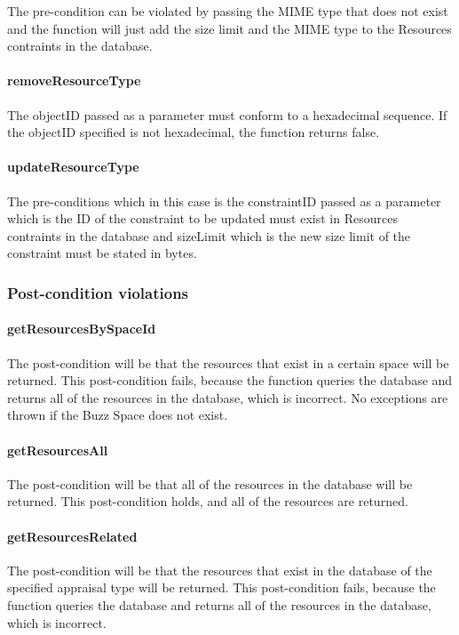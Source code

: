 \documentclass[a4paper]{article}
\begin{document}
The pre-condition can be violated by passing the MIME type that does not exist and the function will just add the size limit and the MIME type to the Resources contraints in the database.

\paragraph{removeResourceType}
The objectID passed as a parameter must conform to a hexadecimal sequence. If the objectID specified is not hexadecimal, the function returns false.

\paragraph{updateResourceType}
The pre-conditions which in this case is the constraintID passed as a parameter which is the ID of the constraint to be updated must exist in Resources contraints in the database and sizeLimit which is the new size limit of the constraint must be stated in bytes.
\subsubsection {Post-condition violations}

\paragraph{getResourcesBySpaceId}
The post-condition will be that the resources that exist in a certain space will be returned. This post-condition fails, because the function queries the database and returns all of the resources in the database, which is incorrect. No exceptions are thrown if the Buzz Space does not exist.

\paragraph{getResourcesAll}
The post-condition will be that all of the resources in the database will be returned. This post-condition holds, and all of the resources are returned.

\paragraph{getResourcesRelated}
The post-condition will be that the resources that exist in the database of the specified appraisal type will be returned. This post-condition fails, because the function queries the database and returns all of the resources in the database, which is incorrect.
\end{document}
